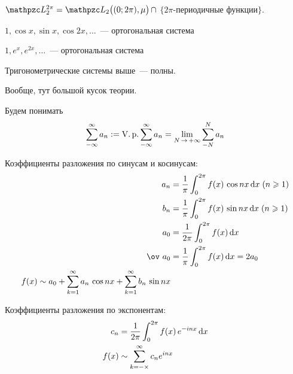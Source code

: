 \documentclass[12pt,draft,timbord]{longnotes}
\begin{document}
\begin{defn}\label{defn:fourier::trigseries::space}
  $\summb_2^{2\pi} = \summb_2\bigl((0;2\pi),\mu\bigr) \, \cap $ $\{2\pi$-периодичные функции$\}$.
\end{defn}

\begin{prop}\label{prop:fourier::trigseries::orthsin}
  $1, \cos x, \sin x, \cos 2x, \dotsc $~--- ортогональная система
\end{prop}
\begin{prop}\label{prop:fourier::trigseries::orthexp}
  $1, e^x, e^{2x}, \dotsc $~--- ортогональная система
\end{prop}

\begin{thrm}\label{thrm:fourier::trigseries::comp}
  Тригонометрические системы выше~--- полны.
\end{thrm}
\begin{tproof}
  \quest Вообще, тут большой кусок теории.
\end{tproof}

\begin{defn}\label{defn:fourier::trigseries::vp}
  Будем понимать 
  \[
    \sum_{-\infty}^\infty a_n := \Vp \sum_{-\infty}^\infty a_n 
    = \lim_{N\to +\infty}  \sum_{-N}^N a_n
  \]
\end{defn}

\begin{prop}\label{prop:fourier::trigseries::sin}
  Коэффициенты разложения по синусам и косинусам:
   \begin{align*}
     a_n &= \frac{1}{\pi} \int_0^{2\pi} f(x) \, \cos nx \, \del x \; (n \geqslant 1)\\ 
     b_n &= \frac{1}{\pi} \int_0^{2\pi} f(x) \, \sin nx \, \del x \; (n \geqslant 1)\\ 
     a_0 &= \frac{1}{2\pi} \int_0^{2\pi} f(x) \, \del x \\ 
     \ov~{a_0} &= \frac{1}{\pi} \int_0^{2\pi} f(x) \, \del x  = 2 a_0\\ 
     f(x) \sim a_0 + \sum_{k=1}^\infty a_n \, \cos nx + \sum_{k=1}^\infty b_n \, \sin nx  
   \end{align*}
\end{prop}
\begin{prop}\label{prop:fourier::trigseries::exp}
  Коэффициенты разложения по экспонентам:
   \begin{align*}
     c_n &= \frac{1}{2\pi} \int_0^{2\pi} f(x) \, e^{-inx} \, \mathrm{d} x \\ 
     f(x) &\sim \sum_{k=-\times}^\infty c_n  e^{inx}
   \end{align*}
\end{prop}
\end{document}
